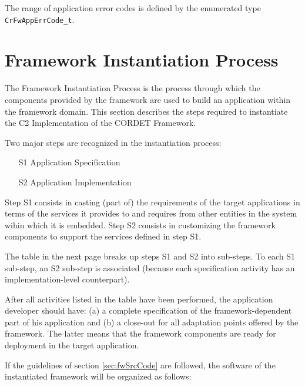 \documentclass{pnp_article}
\begin{document}
The range of application error codes is defined by the enumerated type \texttt{CrFwAppErrCode\_t}.

\section{Framework Instantiation Process}\label{sec:FwInstantiation}
The Framework Instantiation Process is the process through which the components provided by the framework are used to build an application within the framework domain. This section describes the steps required to instantiate the C2 Implementation of the CORDET Framework.

Two major steps are recognized in the instantiation process: 

\begin{enumerate}
\item[S1] Application Specification
\item[S2] Application Implementation
\end{enumerate}

Step S1 consists in casting (part of) the requirements of the target applications in terms of the services it provides to and requires from other entities in the system wihin which it is embedded. Step S2 consists in customizing the framework components to support the services defined in step S1. 

The table in the next page breaks up steps S1 and S2 into sub-steps. To each S1 sub-step, an S2 sub-step is associated (because each specification activity has an implementation-level counterpart). 

After all activities listed in the table have been performed, the application developer should have: (a) a complete specification of the framework-dependent part of his application and (b) a close-out for all adaptation points offered by the framework. The latter means that the framework components are ready for deployment in the target application. 

If the guidelines of section \ref{sec:fwSrcCode} are followed, the software of the instantiated framework will be organized as follows:
\end{document}
